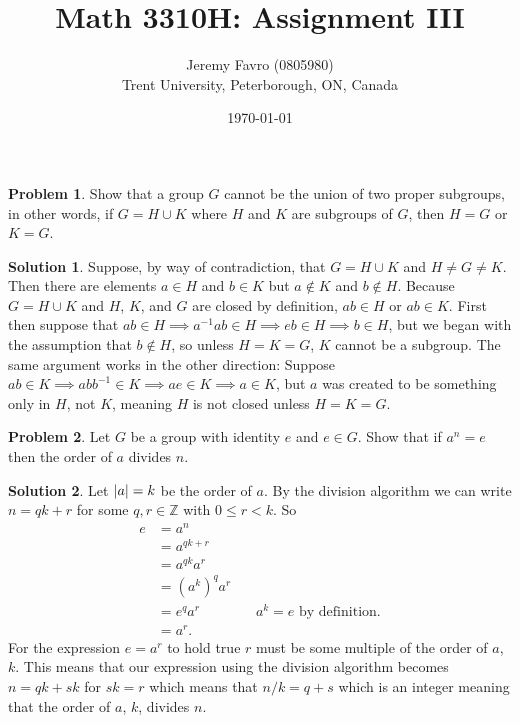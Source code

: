 \documentclass[10pt]{article}
\title{Math 3310H: Assignment III}
\author{Jeremy Favro (0805980) \\ Trent University, Peterborough, ON, Canada}
\date{\today}
\theoremstyle{definition}
\newtheorem{problem}{Problem}
\newtheorem{soln}{Solution}
\newcommand{\justif}[2]{&{#1}&\text{#2}}
\begin{document}
\maketitle

\begin{problem}
Show that a group $G$ cannot be the union of two proper subgroups,
in other words, if $G = H \cup K$ where $H$ and $K$ are subgroups of $G$,
then $H = G$ or $K = G$.
\end{problem}
\begin{soln}
  Suppose, by way of contradiction, that $G=H\cup K$ and $H\neq G \neq K$.
  Then there are elements $a\in H$ and $b\in K$ but $a\notin K$ and $b\notin H$.
  Because $G=H\cup K$ and $H$, $K$, and $G$ are closed by definition, $ab\in H$ or $ab\in K$.
  First then suppose that $ab\in H\implies a^{-1}ab\in H\implies eb\in H\implies b\in H$, but we began
  with the assumption that $b \notin H$, so unless $H=K=G$, $K$ cannot be a subgroup. The same argument works
  in the other direction: Suppose $ab \in K\implies abb^{-1}\in K\implies ae \in K\implies a\in K$, but
  $a$ was created to be something only in $H$, not $K$, meaning $H$ is not closed unless $H=K=G$.
\end{soln}

\begin{problem}
Let $G$ be a group with identity $e$ and $e\in G$. Show that if $a^n = e$
then the order of $a$ divides $n$.
\end{problem}
\begin{soln}
  Let $\abs{a}=k$ be the order of $a$. By the division algorithm we can write
  $n=qk+r$ for some $q,r\in \mathbb{Z}$ with $0\leq r < k$. So
  \begin{align*}
    e & =a^n                                        \\
      & =a^{qk+r}                                   \\
      & =a^{qk}a^r                                  \\
      & =(a^k)^qa^r                                 \\
      & =e^q a^r\justif{\,}{$a^k=e$ by definition.} \\
      & =a^r.
  \end{align*}
  For the expression $e=a^r$ to hold true $r$ must be some multiple of the order of $a$, $k$. This means
  that our expression using the division algorithm becomes $n=qk+sk$ for $sk=r$ which means that $n/k=q+s$ which
  is an integer meaning that the order of $a$, $k$, divides $n$.
\end{soln}
\end{document}
